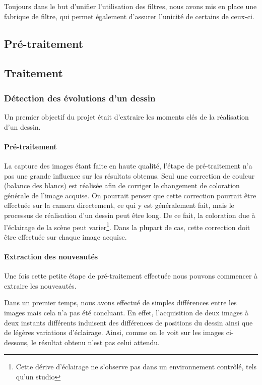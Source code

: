 Toujours dans le but d'unifier l'utilisation des filtres, nous avons mis en place une fabrique de filtre, qui permet également d'assurer l'unicité de certains de ceux-ci.

\subsection{Pré-traitement} %


\subsection{Traitement}
\subsubsection{Détection des évolutions d'un dessin}
Un premier objectif du projet était d'extraire les moments clés de la réalisation d'un dessin.

\paragraph{Pré-traitement\vspace{0.5cm} \\}
La capture des images étant faite en haute qualité, l'étape de pré-traitement n'a pas une grande influence sur les résultats obtenus. Seul une correction de couleur (balance des blancs) est réalisée afin de corriger le changement de coloration générale de l'image acquise. On pourrait penser que cette correction pourrait être effectuée sur la camera directement, ce qui y est généralement fait, mais le processus de réalisation d'un dessin peut être long. De ce fait, la coloration due à l'éclairage de la scène peut varier\footnote{Cette dérive d'éclairage ne s'observe pas dans un environnement contrôlé, tels qu'un studio}. Dans la plupart de cas, cette correction doit être effectuée sur chaque image acquise.

\paragraph{Extraction des nouveautés\vspace{0.5cm}\\}
Une fois cette petite étape de pré-traitement effectuée nous pouvons commencer à extraire les nouveautés.

Dans un premier temps, nous avons effectué de simples différences entre les images mais cela n'a pas été concluant. En effet, l'acquisition de deux images à deux instants différents induisent des différences de positions du dessin ainsi que de légères variations d'éclairage. Ainsi, comme on le voit sur les images ci-dessous, le résultat obtenu n'est pas celui attendu. 

